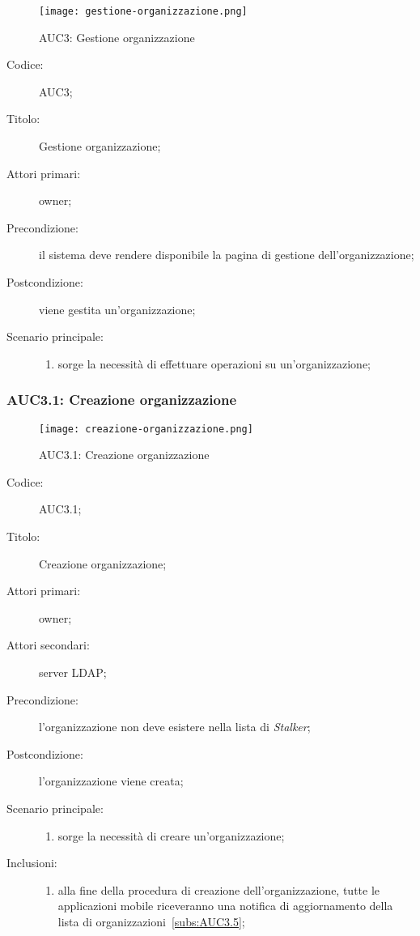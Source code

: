 \documentclass[../../../analisi-dei-requisiti.tex]{subfiles}
\begin{document}
\begin{figure}[H]
  \centering
  \texttt{[image: gestione-organizzazione.png]}
  \caption{AUC3: Gestione organizzazione}%
  \label{fig:AUC3}
\end{figure}

\begin{description}
  \item[Codice:] AUC3;
  \item[Titolo:] Gestione organizzazione;
  \item[Attori primari:] owner;
  \item[Precondizione:] il sistema deve rendere disponibile la pagina di gestione dell'organizzazione;
  \item[Postcondizione:] viene gestita un'organizzazione;
  \item[Scenario principale:]
        \begin{enumerate}
          \item sorge la necessità di effettuare operazioni su un'organizzazione;
        \end{enumerate}
\end{description}

\subsubsection{AUC3.1: Creazione organizzazione}%
\label{subs:AUC3.1}

\begin{figure}[H]
  \centering
  \texttt{[image: creazione-organizzazione.png]}
  \caption{AUC3.1: Creazione organizzazione}%
  \label{fig:AUC3_1}
\end{figure}

\begin{description}
  \item[Codice:] AUC3.1;
  \item[Titolo:] Creazione organizzazione;
  \item[Attori primari:] owner;
  \item[Attori secondari:] server LDAP\@;
  \item[Precondizione:] l'organizzazione non deve esistere nella lista di \emph{Stalker};
  \item[Postcondizione:] l'organizzazione viene creata;
  \item[Scenario principale:]
        \begin{enumerate}
          \item sorge la necessità di creare un'organizzazione;
        \end{enumerate}
  \item[Inclusioni:]
        \begin{enumerate}
          \item alla fine della procedura di creazione dell'organizzazione, tutte le applicazioni mobile riceveranno una notifica di aggiornamento
                della lista di organizzazioni~\ref{subs:AUC3.5};
        \end{enumerate}
\end{description}
\end{document}
